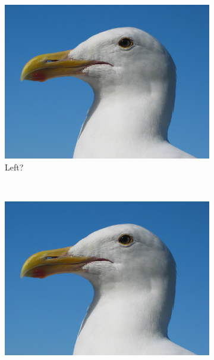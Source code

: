 \documentclass[10pt, a4paper]{article}
\begin{document}
\begin{figure}[htbp]
	\centering
	\begin{subfigure}[b]{0.3\textwidth}
		\includegraphics[width=\textwidth]{images/gull}
		\caption{Left?}
		\label{fig:gullLeft}
	\end{subfigure}
	~
	\begin{subfigure}[b]{0.3\textwidth}
		\includegraphics[height=\textwidth, angle=-90]{images/gull}

\end{subfigure}
\end{figure}
\end{document}
